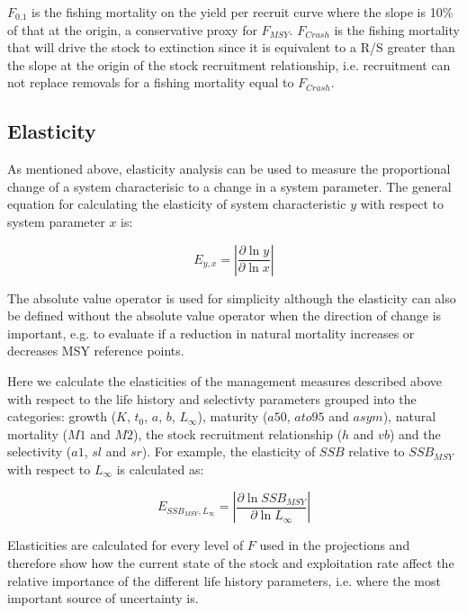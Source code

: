 \documentclass[10pt]{article}
\begin{document}
$F_{0.1}$ is the fishing mortality on the yield per recruit curve where the slope is 10\%  of that at the origin, a conservative proxy for $F_{MSY}$.
$F_{Crash}$ is the fishing mortality that will drive the stock to extinction since it is equivalent to a R/S greater than the slope at the origin of
the stock recruitment relationship, i.e. recruitment can not replace removals for a fishing mortality equal to $F_{Crash}$.  

\subsection{Elasticity}
As mentioned above, elasticity analysis can be used to measure the proportional change of a system characterisic to a change in a system parameter. 
The general equation for calculating the elasticity of system characteristic $y$ with respect to system parameter $x$ is:

\begin{equation}
E_{y,x} = \left| \frac{\partial \ln y}{\partial \ln x} \right|        
%
\end{equation} 

The absolute value operator is used for simplicity although the elasticity can also be defined without the absolute value operator when the direction of 
change is important, e.g. to evaluate if a reduction in natural mortality increases or decreases MSY reference points.	

Here we calculate the elasticities of the management measures described above with respect to the life history and selectivty parameters grouped into the
categories: growth ($K$, $t_0$, $a$, $b$, $L_{\infty}$), maturity ($a50$, $ato95$ and $asym$), natural mortality ($M1$ and $M2$), the stock recruitment
relationship ($h$ and $vb$) and the selectivity ($a1$, $sl$ and $sr$). For example, the elasticity of $SSB$ relative to $SSB_{MSY}$ with respect to $L_{\infty}$ is calculated as:

\begin{equation}
E_{SSB_{MSY},L_{\infty}} = \left| \frac{\partial \ln SSB_{MSY}}{\partial \ln L_{\infty}} \right|
\end{equation}

Elasticities are calculated for every level of $F$ used in the projections and therefore show how the current state of the stock and exploitation rate
affect the relative importance of the different life history parameters, i.e. where the most important source of uncertainty is.
\end{document}
